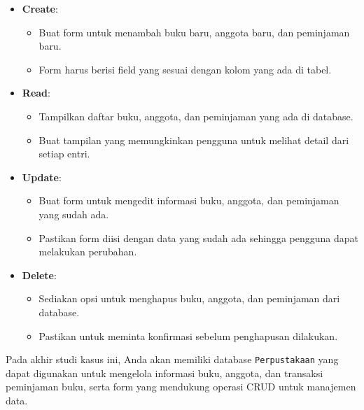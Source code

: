 \begin{itemize}
	\item \textbf{Create}:
	\begin{itemize}
		\item Buat form untuk menambah buku baru, anggota baru, dan peminjaman baru.
		\item Form harus berisi field yang sesuai dengan kolom yang ada di tabel.
	\end{itemize}
	
	\item \textbf{Read}:
	\begin{itemize}
		\item Tampilkan daftar buku, anggota, dan peminjaman yang ada di database.
		\item Buat tampilan yang memungkinkan pengguna untuk melihat detail dari setiap entri.
	\end{itemize}
	
	\item \textbf{Update}:
	\begin{itemize}
		\item Buat form untuk mengedit informasi buku, anggota, dan peminjaman yang sudah ada.
		\item Pastikan form diisi dengan data yang sudah ada sehingga pengguna dapat melakukan perubahan.
	\end{itemize}
	
	\item \textbf{Delete}:
	\begin{itemize}
		\item Sediakan opsi untuk menghapus buku, anggota, dan peminjaman dari database.
		\item Pastikan untuk meminta konfirmasi sebelum penghapusan dilakukan.
	\end{itemize}
\end{itemize}

Pada akhir studi kasus ini, Anda akan memiliki database \texttt{Perpustakaan} yang dapat digunakan untuk mengelola informasi buku, anggota, dan transaksi peminjaman buku, serta form yang mendukung operasi CRUD untuk manajemen data.

